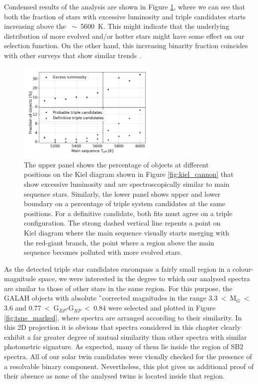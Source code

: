 Condensed results of the analysis are shown in Figure \ref{fig:triple_hr}, where we can see that both the fraction of stars with excessive luminosity and triple candidates starts increasing above the \Teff~$\sim$~5600~K. This might indicate that the underlying distribution of more evolved and/or hotter stars might have some effect on our selection function. On the other hand, this increasing binarity fraction coincides with other surveys that show similar trends \citep{2013ARA&A..51..269D}.

\begin{figure}
	\centering
	\includegraphics[width=0.6\textwidth]{teff_triple_dist.png}
	\caption{The upper panel shows the percentage of objects at different positions on the Kiel diagram shown in Figure \ref{fig:kiel_cannon} that show excessive luminosity and are spectroscopically similar to main sequence stars. Similarly, the lower panel shows upper and lower boundary on a percentage of triple system candidates at the same positions. For a definitive candidate, both fits must agree on a triple configuration. The strong dashed vertical line repents a point on Kiel diagram where the main sequence visually starts merging with the red-giant branch, the point where a region above the main sequence becomes polluted with more evolved stars.}
	\label{fig:triple_hr}
\end{figure}

As the detected triple star candidates encompass a fairly small region in a colour-magnitude space, we were interested in the degree to which our analysed spectra are similar to those of other stars in the same region. For this purpose, the GALAH objects with absolute \G\ corrected magnitudes in the range $3.3$~<~M$_{G}$~<~$3.6$ and $0.77$~<~G$_{BP}$-G$_{RP}$~<~$0.84$ were selected and plotted in Figure \ref{fig:tsne_marked}, where spectra are arranged according to their similarity. In this 2D projection \citep[details about the construction of which are given in][]{2017ApJS..228...24T, buder2018} it is obvious that spectra considered in this chapter clearly exhibit a far greater degree of mutual similarity than other spectra with similar photometric signature. As expected, many of them lie inside the region of SB2 spectra. All of our solar twin candidates were visually checked for the presence of a resolvable binary component. Nevertheless, this plot gives us additional proof of their absence as none of the analysed twins is located inside that region.

